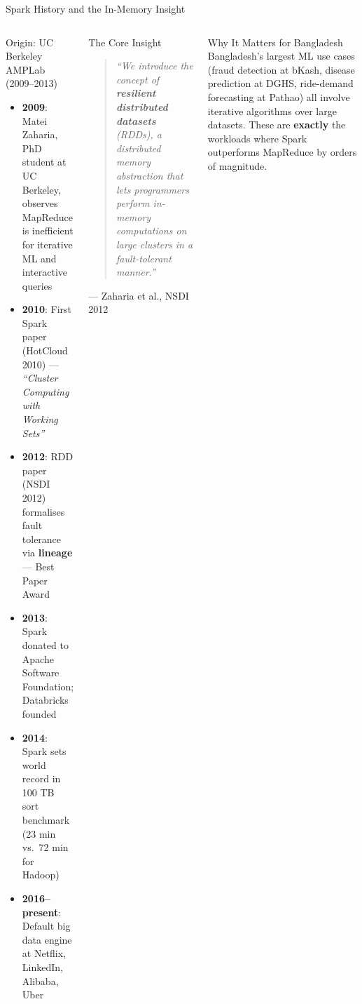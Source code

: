 \documentclass[aspectratio=169,10pt]{beamer}
\begin{document}
\begin{frame}{Spark History and the In-Memory Insight}
  \begin{columns}[T]
      \begin{block}{Origin: UC Berkeley AMPLab (2009--2013)}
        \begin{itemize}
          \item \textbf{2009}: Matei Zaharia, PhD student at UC Berkeley, observes MapReduce is inefficient for iterative ML and interactive queries
          \item \textbf{2010}: First Spark paper (HotCloud 2010) — \textit{``Cluster Computing with Working Sets''}
          \item \textbf{2012}: RDD paper (NSDI 2012) formalises fault tolerance via \textbf{lineage} — Best Paper Award
          \item \textbf{2013}: Spark donated to Apache Software Foundation; Databricks founded
          \item \textbf{2014}: Spark sets world record in 100 TB sort benchmark (23 min vs.\ 72 min for Hadoop)
          \item \textbf{2016--present}: Default big data engine at Netflix, LinkedIn, Alibaba, Uber
        \end{itemize}
      \end{block}

      \begin{alertblock}{The Core Insight}
        \begin{quote}
          \itshape ``We introduce the concept of \textbf{resilient distributed datasets} (RDDs), a distributed memory abstraction that lets programmers perform in-memory computations on large clusters in a fault-tolerant manner.''
        \end{quote}
        \hfill --- Zaharia et al., NSDI 2012
      \end{alertblock}
      \vspace{6pt}
      \begin{exampleblock}{Why It Matters for Bangladesh}
        \small Bangladesh's largest ML use cases (fraud detection at bKash, disease prediction at DGHS, ride-demand forecasting at Pathao) all involve iterative algorithms over large datasets.  These are \textbf{exactly} the workloads where Spark outperforms MapReduce by orders of magnitude.
      \end{exampleblock}
  \end{columns}
\end{frame}
\end{document}
